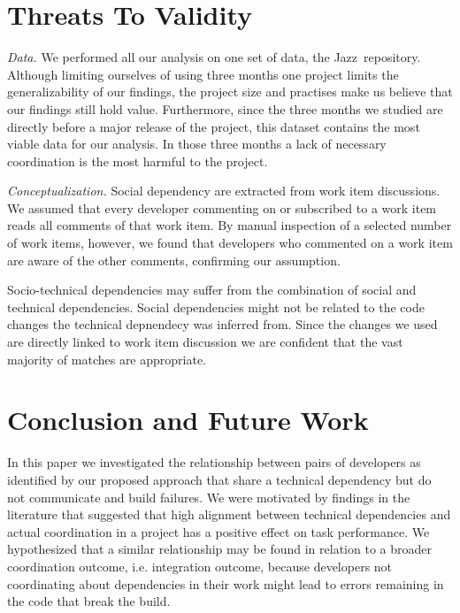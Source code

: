 \documentclass[conference]{IEEEtran}
\begin{document}
\section{Threats To Validity}
\label{sec:threats}
\emph{Data.}
We performed all our analysis on one set of data, the Jazz\texttrademark\
repository. 
Although limiting ourselves of using three months one project limits the generalizability of our findings, the  
project size and practises make us believe that our findings still hold value.
Furthermore, since the three months  we studied are directly before a major release of the project, this dataset contains the most viable data for our analysis. In those three months a lack of necessary coordination is the most harmful to the project.

\emph{Conceptualization.}
Social dependency are extracted from work item discussions. 
We assumed that every developer commenting on or subscribed to a work item reads all comments of that work item. 
By manual inspection of a selected number of work items, however, we found that developers who commented on a work item are aware of the other comments, confirming our assumption.

Socio-technical dependencies may suffer from the combination of social and technical dependencies. 
Social dependencies might not be related to the code changes the technical depnendecy was inferred from.
Since the changes we used are directly linked to work item discussion we are confident that the vast majority of matches are appropriate.


\section{Conclusion and Future Work}
In this paper we investigated the relationship between pairs of developers as identified by our proposed approach that share
a technical dependency but do not communicate and build failures. We were
motivated by findings in the literature that suggested that high alignment between technical dependencies and actual coordination in a project has a positive effect on task
performance.
We hypothesized that a similar relationship may be found in relation to a broader
coordination outcome, i.e. integration outcome, because developers not
coordinating about dependencies in their work might lead to errors remaining in
the code that break the build.
\end{document}
